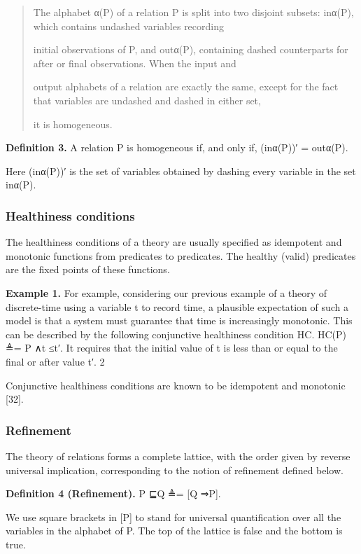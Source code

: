 \documentclass[11pt]{article}
\begin{document}
\begin{quote}\small\raggedright
The alphabet α(P) of a relation P is split into two disjoint subsets: inα(P), which contains undashed variables recording
\par
initial observations of P, and outα(P), containing dashed counterparts for after or final observations. When the input and
\par
output alphabets of a relation are exactly the same, except for the fact that variables are undashed and dashed in either set,
\par
it is homogeneous.
\end{quote}

\noindent\textbf{Definition 3.} A relation P is homogeneous if, and only if, (inα(P))′ = outα(P).


Here (inα(P))′ is the set of variables obtained by dashing every variable in the set inα(P).

\subsubsection{Healthiness conditions}
The healthiness conditions of a theory are usually specified as idempotent and monotonic functions from predicates to predicates. The healthy (valid) predicates are the fixed points of these functions.

\noindent\textbf{Example 1.} For example, considering our previous example of a theory of discrete-time using a variable t to record time, a plausible expectation of such a model is that a system must guarantee that time is increasingly monotonic. This can be described by the following conjunctive healthiness condition HC. HC(P) ≜= P ∧t ≤t′. It requires that the initial value of t is less than or equal to the final or after value t′. 2


Conjunctive healthiness conditions are known to be idempotent and monotonic [32].

\subsubsection{Refinement}
The theory of relations forms a complete lattice, with the order given by reverse universal implication, corresponding to the notion of refinement defined below.

\noindent\textbf{Definition 4 (Refinement).} P ⊑Q ≜= [Q ⇒P].


We use square brackets in [P] to stand for universal quantification over all the variables in the alphabet of P. The top of the lattice is false and the bottom is true.
\end{document}
